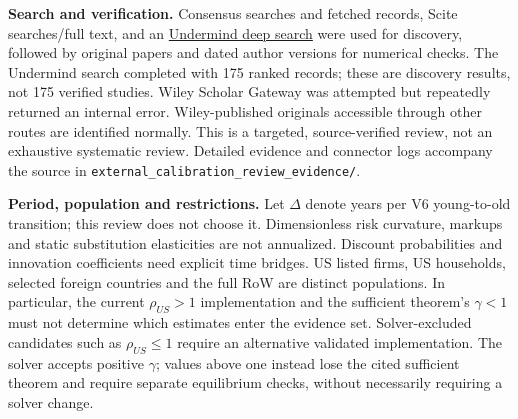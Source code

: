 \documentclass[10pt,a4paper,landscape]{article}
\newcommand{\code}[1]{{\small\texttt{#1}}}
\begin{document}
\textbf{Search and verification.}
Consensus searches and fetched records, Scite searches/full text, and an
\href{https://app.undermind.ai/projects/6513b93c-0aaf-4fd9-9554-e57b8db4a0cf?path=/External\%20calibration\%20of\%20V6\%20preferences\%20and\%20production}{Undermind deep search}
were used for discovery, followed by original papers and dated author versions for numerical checks.
The Undermind search completed with 175 ranked records; these are discovery results, not 175 verified studies.
Wiley Scholar Gateway was attempted but repeatedly returned an internal error.
Wiley-published originals accessible through other routes are identified normally.
This is a targeted, source-verified review, not an exhaustive systematic review.
Detailed evidence and connector logs accompany the source in
\code{external\_calibration\_review\_evidence/}.

\textbf{Period, population and restrictions.}
Let $\Delta$ denote years per V6 young-to-old transition; this review does not choose it.
Dimensionless risk curvature, markups and static substitution elasticities are not
annualized. Discount probabilities and innovation coefficients need explicit time bridges.
US listed firms, US households, selected foreign countries and the full RoW are distinct
populations. In particular, the current $\rho_{US}>1$ implementation and the sufficient
theorem's $\gamma<1$ must not determine which estimates enter the evidence set.
Solver-excluded candidates such as $\rho_{US}\le1$ require an alternative validated
implementation. The solver accepts positive $\gamma$; values above one instead lose
the cited sufficient theorem and require separate equilibrium checks, without necessarily
requiring a solver change.
\end{document}
